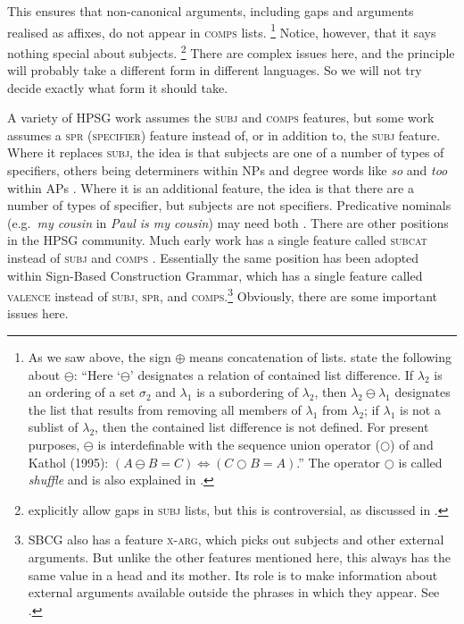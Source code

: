 \documentclass[output=paper
	        ,collection
	        ,collectionchapter
 	        ,biblatex
                ,babelshorthands
                ,newtxmath
                ,draftmode
                ,colorlinks, citecolor=brown
]{langscibook}
\begin{document}
\noindent
This ensures that non-canonical arguments, including gaps and arguments realised as affixes, do not appear in \textsc{comps} lists.%
%
\footnote{\label{fn-shuffle}As we saw above, the sign $\oplus$ means concatenation of lists. \citet[]{GSag2000a-u} state the
  following about $\ominus$: ``Here `$\ominus$' designates a relation of contained list difference. If
$\lambda_2$ is an ordering of a set $\sigma_2$ and $\lambda_1$ is a subordering of $\lambda_2$, then
$\lambda_2 \ominus \lambda_1$ designates the list that results from removing all members of
$\lambda_1$ from $\lambda_2$; if $\lambda_1$ is not a sublist of $\lambda_2$, then the contained
list difference is not defined. For present purposes, $\ominus$ is interdefinable with the sequence
union operator ($\bigcirc$\is{$\bigcirc$}) of
\citet{Reape94a} and Kathol (1995): $(A \ominus B = C) \Leftrightarrow (C \bigcirc B = A)$.'' The
operator $\bigcirc$ is called \emph{shuffle} and is also explained in \crossrefchapterw[\page \pageref{rel-shuffle}]{order}.}
%
Notice, however, that it says nothing special about subjects.%
%
\footnote{\citet[177--183]{GSag2000a-u} explicitly allow gaps in \textsc{subj} lists, but this is
  controversial, as discussed in \crossrefchapterw[\page
  \pageref{udc:page-subject-gaps-start}--\pageref{udc:page-subject-gaps-end}]{udc}.}
%
There are complex issues here, and the principle will probably take a different form in different languages. So we will not try decide exactly what form it should take.

A variety of HPSG work assumes the \textsc{subj} and \textsc{comps} features, but some work assumes
a \textsc{spr (specifier)} feature instead of, or in addition to, the \textsc{subj} feature. Where it
replaces \textsc{subj}, the idea is that subjects are one of a number of types of specifiers, others
being determiners within NPs and degree words like \emph{so} and \emph{too} within APs
\citep[]{ps2}. Where it is an additional feature, the idea is that there are a number of
types of specifier, but subjects are not specifiers. Predicative nominals (e.g.\ \emph{my cousin} in
\emph{Paul is my cousin}) may need both
\parencites[Section~9.4.1]{ps2}[409]{GSag2000a-u}{AG2003b-u}. There are other positions in the HPSG 
community. Much early work has a single feature called \textsc{subcat}
instead of \textsc{subj} and \textsc{comps} \citep{ps}. Essentially the same position has been
adopted within Sign-Based Construction Grammar, which has a single feature called \textsc{valence}
instead of \textsc{subj}, \textsc{spr}, and \textsc{comps}.\footnote{%
  SBCG also has a feature \textsc{x-arg}, which picks out subjects and other external arguments. But
  unlike the other features mentioned here, this always has the same value in a head and its
  mother. Its role is to make information about external arguments available outside the phrases in
  which they appear.  See \citet[84, 149--151]{Sag2007a,Sag2012a}.} 
%
Obviously, there are some important issues here.
\end{document}

